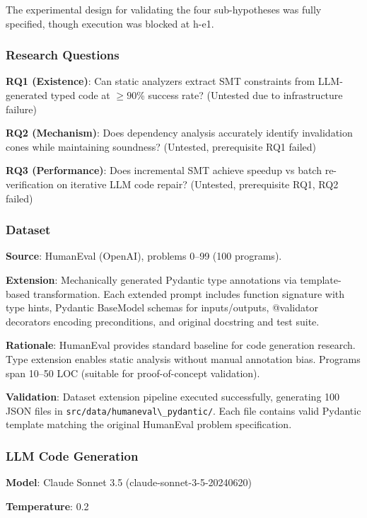 
The experimental design for validating the four sub-hypotheses was fully specified, though execution was blocked at h-e1.

\subsubsection{Research Questions}

\textbf{RQ1 (Existence)}: Can static analyzers extract SMT constraints from LLM-generated typed code at $\geq 90$\% success rate? (Untested due to infrastructure failure)

\textbf{RQ2 (Mechanism)}: Does dependency analysis accurately identify invalidation cones while maintaining soundness? (Untested, prerequisite RQ1 failed)

\textbf{RQ3 (Performance)}: Does incremental SMT achieve speedup vs batch re-verification on iterative LLM code repair? (Untested, prerequisite RQ1, RQ2 failed)

\subsubsection{Dataset}

\textbf{Source}: HumanEval (OpenAI), problems 0--99 (100 programs).

\textbf{Extension}: Mechanically generated Pydantic type annotations via template-based transformation. Each extended prompt includes function signature with type hints, Pydantic BaseModel schemas for inputs/outputs, @validator decorators encoding preconditions, and original docstring and test suite.

\textbf{Rationale}: HumanEval provides standard baseline for code generation research. Type extension enables static analysis without manual annotation bias. Programs span 10--50 LOC (suitable for proof-of-concept validation).

\textbf{Validation}: Dataset extension pipeline executed successfully, generating 100 JSON files in \texttt{src/data/humaneval\textbackslash \_pydantic/}. Each file contains valid Pydantic template matching the original HumanEval problem specification.

\subsubsection{LLM Code Generation}

\textbf{Model}: Claude Sonnet 3.5 (claude-sonnet-3-5-20240620)

\textbf{Temperature}: 0.2

